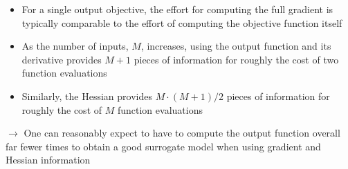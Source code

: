 \documentclass{beamer}
\begin{document}
\begin{frame}[allowframebreaks]
\begin{itemize}
\begin{itemize}

\item For a single output objective, the effort for computing the full gradient is typically comparable to the effort of computing the objective function itself

\item As the number of inputs, $M$, increases, using the output function and its derivative provides \mbox{$M+1$} pieces of information for roughly the cost of two function evaluations

\item Similarly, the Hessian provides \mbox{$M \cdot (M+1)/2$} pieces of information for roughly the cost of $M$ function evaluations

\end{itemize}

$\rightarrow$ One can reasonably expect to have to compute the output function overall far fewer times to obtain a good surrogate model when using gradient and Hessian information

\end{itemize}

\end{frame}


\end{document}
